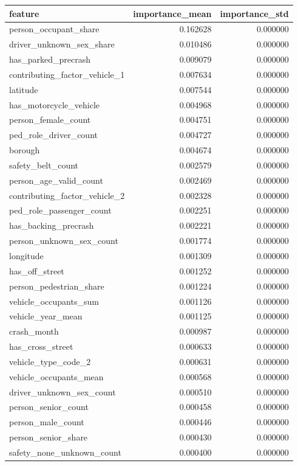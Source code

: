 \begin{tabular}{lrr}
\toprule
feature & importance_mean & importance_std \\
\midrule
person_occupant_share & 0.162628 & 0.000000 \\
driver_unknown_sex_share & 0.010486 & 0.000000 \\
has_parked_precrash & 0.009079 & 0.000000 \\
contributing_factor_vehicle_1 & 0.007634 & 0.000000 \\
latitude & 0.007544 & 0.000000 \\
has_motorcycle_vehicle & 0.004968 & 0.000000 \\
person_female_count & 0.004751 & 0.000000 \\
ped_role_driver_count & 0.004727 & 0.000000 \\
borough & 0.004674 & 0.000000 \\
safety_belt_count & 0.002579 & 0.000000 \\
person_age_valid_count & 0.002469 & 0.000000 \\
contributing_factor_vehicle_2 & 0.002328 & 0.000000 \\
ped_role_passenger_count & 0.002251 & 0.000000 \\
has_backing_precrash & 0.002221 & 0.000000 \\
person_unknown_sex_count & 0.001774 & 0.000000 \\
longitude & 0.001309 & 0.000000 \\
has_off_street & 0.001252 & 0.000000 \\
person_pedestrian_share & 0.001224 & 0.000000 \\
vehicle_occupants_sum & 0.001126 & 0.000000 \\
vehicle_year_mean & 0.001125 & 0.000000 \\
crash_month & 0.000987 & 0.000000 \\
has_cross_street & 0.000633 & 0.000000 \\
vehicle_type_code_2 & 0.000631 & 0.000000 \\
vehicle_occupants_mean & 0.000568 & 0.000000 \\
driver_unknown_sex_count & 0.000510 & 0.000000 \\
person_senior_count & 0.000458 & 0.000000 \\
person_male_count & 0.000446 & 0.000000 \\
person_senior_share & 0.000430 & 0.000000 \\
safety_none_unknown_count & 0.000400 & 0.000000 \\

\end{tabular}
